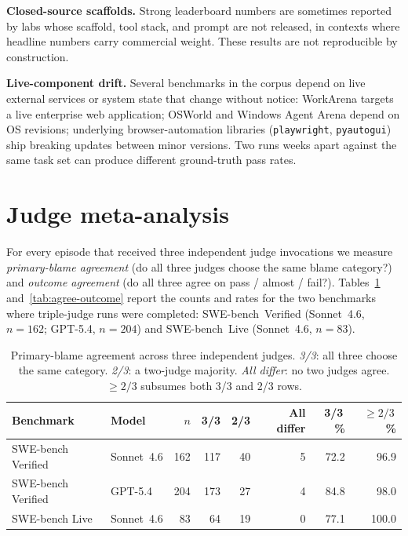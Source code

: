 \documentclass{article}
\newcommand{\mypar}[1]{\par\noindent\textbf{#1}\enspace}
\begin{document}
\mypar{Closed-source scaffolds.}
Strong leaderboard numbers are sometimes reported by labs whose
scaffold, tool stack, and prompt are not released, in contexts where
headline numbers carry commercial weight. These results are not
reproducible by construction.

\mypar{Live-component drift.}
Several benchmarks in the corpus depend on live external services or
system state that change without notice: WorkArena targets a live
enterprise web application; OSWorld and Windows Agent Arena depend on
OS revisions; underlying browser-automation libraries
(\texttt{playwright}, \texttt{pyautogui}) ship breaking updates between
minor versions. Two runs weeks apart against the same task set can
produce different ground-truth pass rates.

\section{Judge meta-analysis}
\label{apdx:judge-meta}

For every episode that received three independent judge invocations we
measure \emph{primary-blame agreement} (do all three judges choose the
same blame category?) and \emph{outcome agreement} (do all three agree on
pass / almost / fail?).
Tables~\ref{tab:agree-blame} and~\ref{tab:agree-outcome} report the counts
and rates for the two benchmarks where triple-judge runs were completed:
SWE-bench~Verified (Sonnet~4.6, $n{=}162$; GPT-5.4, $n{=}204$) and
SWE-bench~Live (Sonnet~4.6, $n{=}83$).

\begin{table}[h]
\centering
\caption{Primary-blame agreement across three independent judges.
  \emph{3/3}: all three choose the same category.
  \emph{2/3}: a two-judge majority.
  \emph{All differ}: no two judges agree.
  ${\geq}2/3$ subsumes both 3/3 and 2/3 rows.}
\label{tab:agree-blame}
\small
\setlength{\tabcolsep}{6pt}
\renewcommand{\arraystretch}{1.15}
\begin{tabular}{llrrrrrr}
\toprule
Benchmark & Model & $n$ & 3/3 & 2/3 & All differ & 3/3\,\% & ${\geq}2/3$\,\% \\
\midrule
SWE-bench Verified & Sonnet~4.6 & 162 & 117 & 40 & 5 & 72.2 & 96.9 \\
SWE-bench Verified & GPT-5.4    & 204 & 173 & 27 & 4 & 84.8 & 98.0 \\
SWE-bench Live     & Sonnet~4.6 &  83 &  64 & 19 & 0 & 77.1 & 100.0 \\
\bottomrule
\end{tabular}
\end{table}
\end{document}
